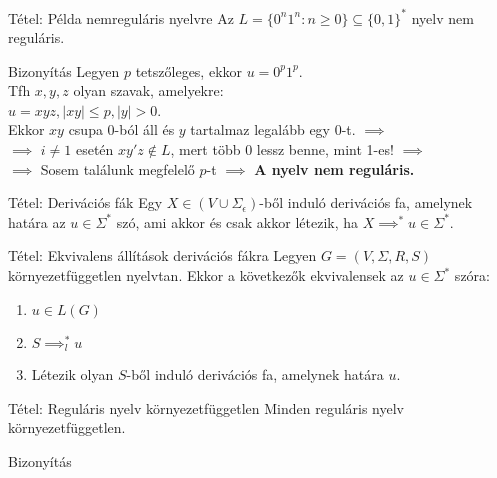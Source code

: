 \documentclass{beamer}
\begin{document}
\begin{frame}
\begin{block}{Tétel: Példa nemreguláris nyelvre}
Az $L = \{0^n1^n : n \geq 0\} \subseteq \{0, 1\}^*$ nyelv nem reguláris.
\end{block}

\begin{block}{Bizonyítás}
Legyen $p$  tetszőleges, ekkor $u = 0^p1^p$.\\
Tfh $x, y, z$ olyan szavak, amelyekre:\\
$u = xyz, |xy| \leq p, |y| > 0$.\\
Ekkor $xy$ csupa 0-ból áll és $y$ tartalmaz legalább egy 0-t. $\implies$\\
$\implies$ $i \neq 1$ esetén $xy'z \notin L$, mert több 0 lessz benne, mint 1-es! $\implies$\\
$\implies$ Sosem találunk megfelelő $p$-t $\implies$ \textbf{A nyelv nem reguláris.}
\end{block}

\end{frame}


\begin{frame}
\begin{block}{Tétel: Derivációs fák}
Egy $X \in (V \cup {\Sigma}_{\epsilon})$-ből induló derivációs fa, amelynek határa az $u \in {\Sigma}^*$ szó, ami akkor és csak akkor létezik, ha $X {\implies}^* u \in {\Sigma}^*$.
\end{block}

\begin{block}{Tétel: Ekvivalens állítások derivációs fákra}
Legyen $G = (V, {\Sigma}, R, S)$ környezetfüggetlen nyelvtan. Ekkor a következők ekvivalensek az $u \in {\Sigma}^*$ szóra:\\
\begin{enumerate}
\item $u \in L(G)$
\item $S {\implies}^*_l u$
\item Létezik olyan $S$-ből induló derivációs fa, amelynek határa $u$.
\end{enumerate}

\end{block}

\end{frame}

\begin{frame}
\begin{block}{Tétel: Reguláris nyelv környezetfüggetlen}
Minden reguláris nyelv környezetfüggetlen.
\end{block}

\begin{block}{Bizonyítás}

\end{block}

\end{frame}
\end{document}
